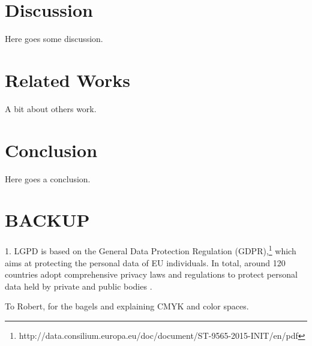 \documentclass[sigconf]{acmart}
\begin{document}
\section{Discussion}

Here goes some discussion.

\section{Related Works}
A bit about others work.


\section{Conclusion}
Here goes a conclusion.


\section{BACKUP}
1.%
LGPD is based on the General Data Protection Regulation (GDPR),\footnote{http://data.consilium.europa.eu/doc/document/ST-9565-2015-INIT/en/pdf} which aims at protecting the personal data of EU individuals. In total, around 120 countries adopt comprehensive privacy laws and regulations to protect personal data held by private and public bodies \cite{Banisar2011}.



%
\begin{acks}
To Robert, for the bagels and explaining CMYK and color spaces.
\end{acks}

%


\end{document}
